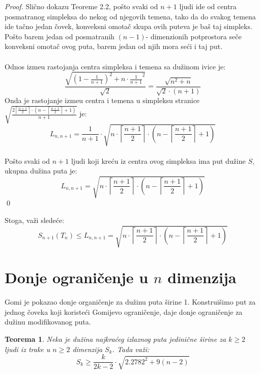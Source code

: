 \documentclass[11pt]{article}
\newtheorem{teo}{\bf Teorema}[section]
\begin{document}
\begin{proof}
Sli\v cno dokazu Teoreme 2.2, po\v sto svaki od $n+1$ ljudi ide od centra posmatranog simpleksa do nekog od njegovih temena, tako da do svakog temena ide ta\v cno jedan \v covek, konveksni omota\v c skupa ovih puteva je ba\v s taj simpleks. Po\v sto barem jedan od posmatranih $(n-1)$- dimenzionih potprostora se\v ce konveksni omota\v c ovog puta, barem jedan od njih mora se\' ci i taj put. 
\\
\\
\indent Odnos izme\dj u rastojanja centra simpleksa i temena sa du\v zinom ivice je:
$$\frac{\sqrt{\left( 1-\frac{1}{n+1}\right)^2+n\cdot{\frac{1}{n+1}}^2}}{\sqrt2}=\frac{\sqrt{n^2+n}}{\sqrt2 \cdot(n+1)}$$
\indent Onda je rastojanje izme\dj u centra i temena u simpleksu stranice  $\sqrt{\frac{2\left\lceil \frac{n+1}{2}\right\rceil\cdot \left( n-\left\lceil\frac{n+1}{2}\right\rceil+1\right)}{n+1}}$ je:
\\
$$L_{n,n+1}=\frac{1}{n+1}\cdot\sqrt{n\cdot\left\lceil\frac{n+1}{2}\right\rceil\cdot\left( n-\left\lceil\frac{n+1}{2}\right\rceil+1\right)}$$
\\
\indent Po\v sto svaki od $n+1$ ljudi koji kre\' cu iz centra ovog simpleksa ima put du\v zine $S$, ukupna du\v zina puta je:
\\
$$L_{n,n+1}=\sqrt{n\cdot\left\lceil\frac{n+1}{2}\right\rceil\cdot\left( n-\left\lceil\frac{n+1}{2}\right\rceil +1\right)}$$
\qed
\end{proof}
\indent Stoga, va\v zi slede\' ce:
$$S_{n+1}(T_n)\leqslant L_{n,n+1}= \sqrt{n\cdot\left\lceil\frac{n+1}{2}\right\rceil\cdot\left( n-\left\lceil\frac{n+1}{2}\right\rceil +1\right)}$$


\section{Donje ograni\v cenje u $n$ dimenzija}
\bigskip
Gomi \cite{Ghomi} je pokazao donje organi\v cenje za du\v zinu puta \v sirine 1. Konstrui\v simo put za jednog \v coveka koji koriste\' ci Gomijevo ograni\v cenje, daje donje ograni\v cenje za du\v zinu modifikovanog puta.

\begin{teo}
Neka je du\v zina najkra\' ceg izlaznog puta jedini\v cne \v sirine za $k\geqslant 2$ ljudi iz trake u $n\geqslant 2$ dimenzija $S_k$. Tada va\v zi:
$$S_k\geqslant\frac{k}{2k-2}\cdot \sqrt{2.2782^2+9(n-2)}$$
\end{teo}
\end{document}
